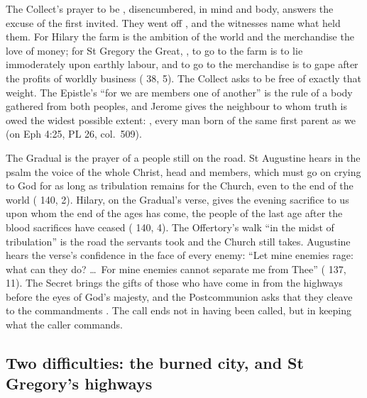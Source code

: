 The Collect's prayer to be , disencumbered, in mind and body,
answers the excuse of the first invited. They went off , and the witnesses name what held them.
For Hilary the farm is the ambition of the world and the merchandise the love
of money; for St Gregory the Great, , to go to the farm is to lie immoderately upon
earthly labour, and to go to the merchandise is to gape after the profits of
worldly business ( 38, 5). The Collect asks to be
free of exactly that weight. The Epistle's ``for we are members one of
another'' is the rule of a body gathered from both peoples, and Jerome gives
the neighbour to whom truth is owed the widest possible extent:
, every man
born of the same first parent as we (on Eph 4:25, PL 26, col.~509).

The Gradual is the prayer of a people still on the road. St Augustine hears in
the psalm the voice of the whole Christ, head and members, which must go on
crying to God for as long as tribulation remains for the Church, even to the
end of the world ( 140, 2). Hilary, on the Gradual's verse,
gives the evening sacrifice to us upon whom the end of the ages has come, the
people of the last age after the blood sacrifices have ceased ( 140, 4). The Offertory's walk
``in the midst of tribulation'' is the road the servants took and the Church
still takes. Augustine hears the verse's confidence in the face of every enemy:
``Let mine enemies rage: what can they do? \dots\ For mine enemies cannot
separate me from Thee'' ( 137, 11). The Secret brings the gifts of those who have
come in from the highways before the eyes of God's majesty, and the
Postcommunion asks that they cleave to the commandments . The
call ends not in having been called, but in keeping what the caller commands.

\subsection{Two difficulties: the burned city, and St Gregory's highways}


